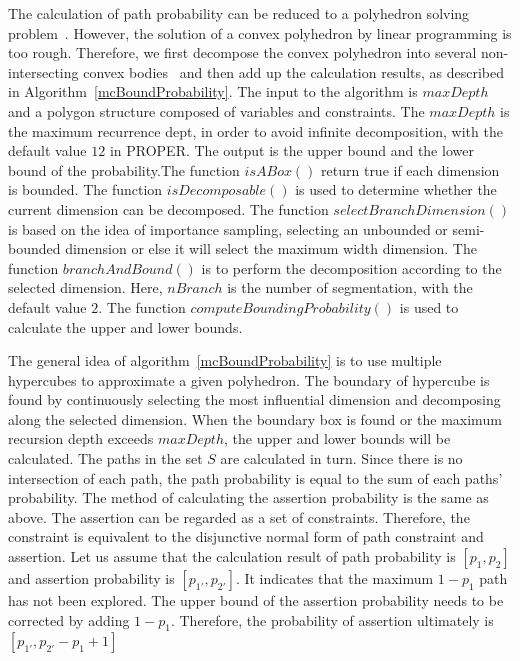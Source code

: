 \documentclass[runningheads]{llncs}
\begin{document}
The calculation of path probability can be reduced to a polyhedron solving problem~\cite{Visser2012Green}. However, the solution of a convex polyhedron by linear programming is too rough. Therefore, we first decompose the convex polyhedron into several non-intersecting convex bodies~\cite{Bingsheng2020} and then add up the calculation results, as described in Algorithm~\ref{mcBoundProbability}. The input to the algorithm is $maxDepth$ and a polygon structure composed of variables and constraints. The $maxDepth$ is the maximum recurrence dept, in order to avoid infinite decomposition, with the default value $12$ in PROPER. The output is the upper bound and the lower bound of the probability.The function $isABox()$ return true if each dimension is bounded. The function $isDecomposable()$ is used to determine whether the current dimension can be decomposed. The function $selectBranchDimension()$ is based on the idea of importance sampling, selecting an unbounded or semi-bounded dimension or else it will select the maximum width dimension. The function $branchAndBound()$ is to perform the decomposition according to the selected dimension. Here, $nBranch$ is the number of segmentation, with the default value $2$. The function $computeBoundingProbability()$ is used to calculate the upper and lower bounds. 

The general idea of algorithm~\ref{mcBoundProbability} is to use multiple hypercubes to approximate a given polyhedron. The boundary of hypercube is found by continuously selecting the most influential dimension and decomposing along the selected dimension. When the boundary box is found or the maximum recursion depth exceeds $maxDepth$, the upper and lower bounds will be calculated.
The paths in the set $S$ are calculated in turn. Since there is no intersection of each path, the path probability is equal to the sum of each paths' probability. The method of calculating the assertion probability is the same as above. The assertion can be regarded as a set of constraints. Therefore, the constraint is equivalent to the disjunctive normal form of path constraint and assertion.
Let us assume that the calculation result of path probability is $[p_1,p_2]$ and assertion probability is $[p_{1'},p_{2'}]$. It indicates that the maximum $1-p_1$ path has not been explored. The upper bound of the assertion probability needs to be corrected by adding $1-p_1$. Therefore, the probability of assertion ultimately is $[p_{1'},p_{2'}-p_1+1]$
\end{document}
